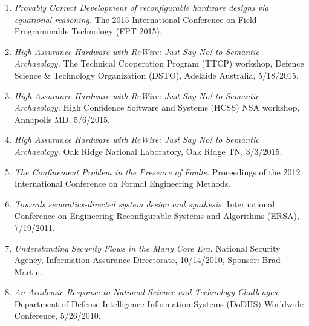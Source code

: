 \documentclass[12pt]{article} %
\begin{document}
\begin{enumerate}[leftmargin=0mm]
\item{\it Provably Correct Development of reconfigurable hardware designs via equational reasoning.} The 2015 International Conference on Field-Programmable Technology (FPT 2015).

\item{\it High Assurance Hardware with ReWire: Just Say No! to Semantic Archaeology.}
The Technical Cooperation Program (TTCP) workshop, Defence Science \& Technology Organization (DSTO), Adelaide Australia, 5/18/2015.






\item{\it High Assurance Hardware with ReWire: Just Say No! to Semantic Archaeology.}
High Confidence Software and Systems (HCSS) NSA workshop, Annapolis MD, 5/6/2015.

\item{\it High Assurance Hardware with ReWire: Just Say No! to Semantic Archaeology.}
Oak Ridge National Laboratory, Oak Ridge TN, 3/3/2015.

\item{\it The Confinement Problem in the Presence of Faults.} Proceedings of the 2012 International Conference on Formal Engineering Methods.

\item{\it Towards semantics-directed system design and synthesis.}
International Conference on
  Engineering Reconfigurable Systems and Algorithms (ERSA), 7/19/2011.
  
\item{\it Understanding Security Flows in the Many Core Era.}
National Security Agency, Information Assurance Directorate, 
10/14/2010, Sponsor: Brad Martin.

\item{\it An Academic Response to National Science and Technology Challenges.}
Department of Defense Intelligence Information Systems (DoDIIS) Worldwide Conference, 5/26/2010.


\end{enumerate}
\end{document}
